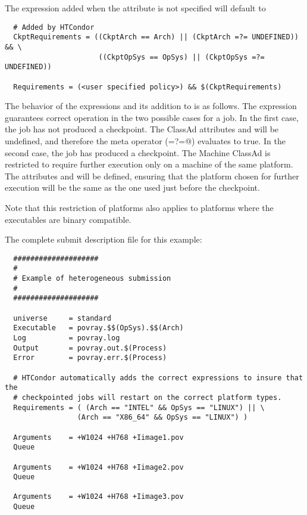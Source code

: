 The expression added when the attribute  is not specified 
will default to

\footnotesize
\begin{verbatim}
  # Added by HTCondor
  CkptRequirements = ((CkptArch == Arch) || (CkptArch =?= UNDEFINED)) && \
                      ((CkptOpSys == OpSys) || (CkptOpSys =?= UNDEFINED))

  Requirements = (<user specified policy>) && $(CkptRequirements)
\end{verbatim}
\normalsize

The behavior of the  expressions and its addition to
\AdAttr{requirements} is as follows.
The  expression guarantees correct operation
in the two possible cases for a job.
In the first case, the job has not produced a checkpoint.
The ClassAd attributes  and 
will be undefined, and therefore the meta operator (\verb@=?=@)
evaluates to true.
In the second case, the job has produced a checkpoint.
The Machine ClassAd is restricted to require further execution
only on a machine of the same platform.
The attributes  and 
will be defined, ensuring that the platform chosen for further
execution will be the same as the one used just before the
checkpoint.

Note that this restriction of platforms also applies to platforms where
the executables are binary compatible.

The complete submit description file for this example:

\begin{verbatim}
  ####################
  #
  # Example of heterogeneous submission
  #
  ####################

  universe     = standard
  Executable   = povray.$$(OpSys).$$(Arch)
  Log          = povray.log
  Output       = povray.out.$(Process)
  Error        = povray.err.$(Process)

  # HTCondor automatically adds the correct expressions to insure that the
  # checkpointed jobs will restart on the correct platform types.
  Requirements = ( (Arch == "INTEL" && OpSys == "LINUX") || \
                 (Arch == "X86_64" && OpSys == "LINUX") )

  Arguments    = +W1024 +H768 +Iimage1.pov
  Queue 

  Arguments    = +W1024 +H768 +Iimage2.pov
  Queue 

  Arguments    = +W1024 +H768 +Iimage3.pov
  Queue 
\end{verbatim}


